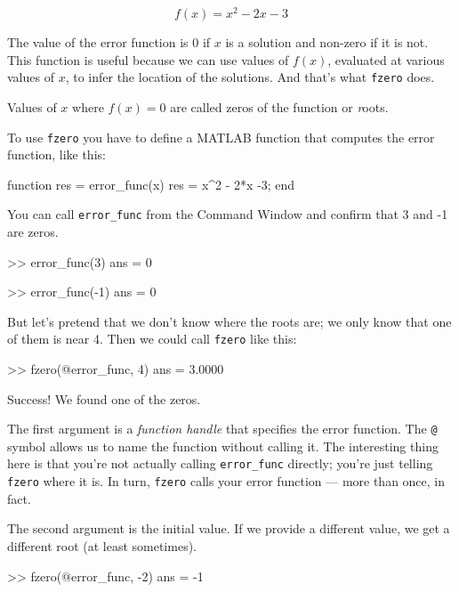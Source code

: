 \begin{equation}
f(x) = x^2 - 2x -3
\end{equation}

The value of the error function is 0 if $x$ is a solution and non-zero if it is not.
This function is useful because we can use values of $f(x)$, evaluated at various values of $x$, to infer the location of the solutions.  And that's what {\tt fzero} does.

Values of $x$ where $f(x) = 0$ are called zeros of the function or {\emph roots}.


To use {\tt fzero} you have to define a MATLAB function that computes the error function, like this:

\begin{code}
function res = error_func(x)
    res = x^2 - 2*x -3;
end
\end{code}

You can call \verb"error_func" from the Command Window and confirm that 3 and -1 are zeros.

\begin{code}
>> error_func(3)
ans = 0

>> error_func(-1)
ans = 0
\end{code}

But let's pretend that we don't know where the roots are; we only know that one of them is near 4.  Then we could call {\tt fzero} like this:

\begin{code}
>> fzero(@error_func, 4)
ans = 3.0000
\end{code}

Success!  We found one of the zeros.

The first argument is a {\em function handle} that specifies
the error function.  The {\tt @} symbol allows us to name the
function without calling it.  The interesting thing here is
that you're not actually calling \verb"error_func" directly;
you're just telling {\tt fzero} where it is.  In turn, {\tt fzero}
calls your error function --- more than once, in fact.


The second argument is the initial value.  If we provide a different
value, we get a different root (at least sometimes).

\begin{code}
>> fzero(@error_func, -2)
ans = -1
\end{code}

